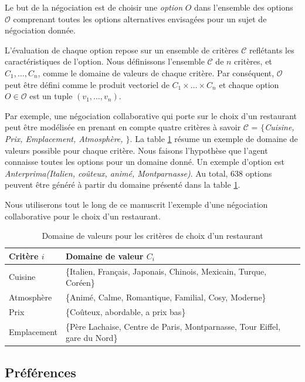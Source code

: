 Le but de la négociation est de choisir une \textit{option} $O$ dans l'ensemble des options $\mathcal{O}$ comprenant toutes les options alternatives envisagées pour un sujet de négociation donnée. 

L'évaluation de chaque option repose sur un ensemble de critères $\mathcal{C}$ reflétants les caractéristiques de l'option. Nous définissons l'ensemble $\mathcal{C}$ de $n$ critères, et $C_1,\ldots,C_n$, comme le domaine de valeurs de chaque critère. 
Par conséquent, $\mathcal{O}$ peut être défini comme le produit vectoriel de  $C_1\times\ldots\times C_n$ et chaque option $O \in \mathcal{O}$ est un tuple $(v_1,\ldots,v_n)$. 

Par exemple, une négociation collaborative qui porte sur le choix d'un restaurant peut être modélisée en prenant en compte quatre critères à savoir $\mathcal{C}$ = \emph{$\{$Cuisine, Prix, Emplacement, Atmosphère, $\}$}. La table \ref{tab:domain} résume un exemple de domaine de valeurs possible pour chaque critère. Nous faisons l'hypothèse que l'agent connaisse toutes les options pour un domaine donné. Un exemple d'option est  \emph{Anterprima(Italien, coûteux, animé, Montparnasse)}. Au total, $638$ options peuvent être généré à partir du domaine présenté dans la table \ref{tab:domain}. 

Nous utiliserons tout le long de ce manuscrit l'exemple d'une négociation collaborative pour le choix d'un restaurant. 
\begin{table}[h]
	\centering
	\begin{tabular}{ >{\centering\arraybackslash}m{2.25cm}  >{\centering\arraybackslash}m{8.6cm}}
		\hline
		\hline
		\textbf{Critère $i $} &\textbf{ Domaine de valeur $C_i$} \\
		\hline
		Cuisine & \{Italien, Français, Japonais, Chinois, Mexicain, Turque, Coréen\} \\
		\hline
		Atmosphère & \{Animé, Calme, Romantique, Familial, Cosy, Moderne\} \\
		\hline
		Prix & \{Coûteux, abordable, a prix bas\} \\
		\hline
		Emplacement & \{Père Lachaise, Centre de Paris, Montparnasse, Tour Eiffel, gare du Nord\} \\
		\hline
		\hline
	\end{tabular}
	\caption{Domaine de valeurs pour les critères de choix d'un restaurant} 
	\label{tab:domain}
\end{table}


\subsection{Préférences}

